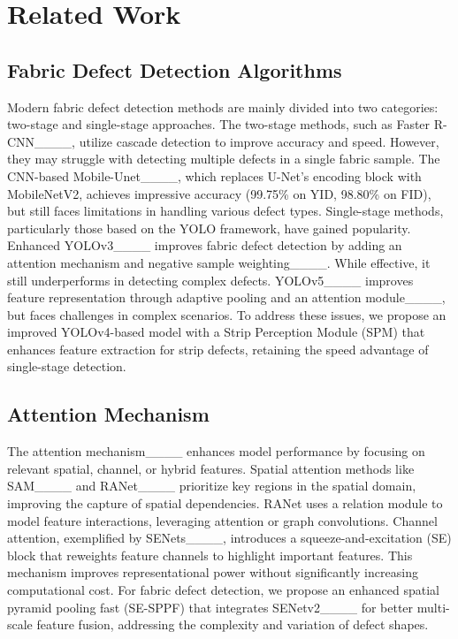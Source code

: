 \section{Related Work}
\label{sec:rw}

\subsection{Fabric Defect Detection Algorithms}
Modern fabric defect detection methods are mainly divided into two categories: two-stage and single-stage approaches. The two-stage methods, such as Faster R-CNN____, utilize cascade detection to improve accuracy and speed. However, they may struggle with detecting multiple defects in a single fabric sample. The CNN-based Mobile-Unet____, which replaces U-Net’s encoding block with MobileNetV2, achieves impressive accuracy (99.75\% on YID, 98.80\% on FID), but still faces limitations in handling various defect types.
Single-stage methods, particularly those based on the YOLO framework, have gained popularity. Enhanced YOLOv3____ improves fabric defect detection by adding an attention mechanism and negative sample weighting____. While effective, it still underperforms in detecting complex defects. YOLOv5____ improves feature representation through adaptive pooling and an attention module____, but faces challenges in complex scenarios. To address these issues, we propose an improved YOLOv4-based model with a Strip Perception Module (SPM) that enhances feature extraction for strip defects, retaining the speed advantage of single-stage detection.

\subsection{Attention Mechanism}
The attention mechanism____ enhances model performance by focusing on relevant spatial, channel, or hybrid features. Spatial attention methods like SAM____ and RANet____ prioritize key regions in the spatial domain, improving the capture of spatial dependencies. RANet uses a relation module to model feature interactions, leveraging attention or graph convolutions.
Channel attention, exemplified by SENets____, introduces a squeeze-and-excitation (SE) block that reweights feature channels to highlight important features. This mechanism improves representational power without significantly increasing computational cost. For fabric defect detection, we propose an enhanced spatial pyramid pooling fast (SE-SPPF) that integrates SENetv2____ for better multi-scale feature fusion, addressing the complexity and variation of defect shapes.

